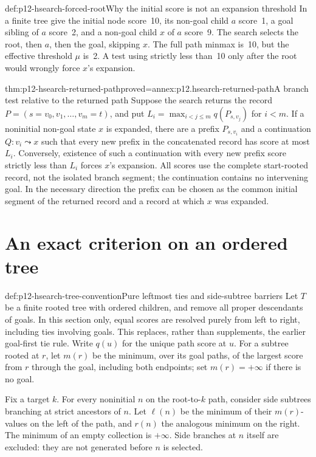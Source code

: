 \begin{hbexample}{def:p12-hsearch-forced-root}{Why the initial score is not an expansion threshold}
In a finite tree give the initial node score~10, its non-goal child
\(a\) score~1, a goal sibling of \(a\) score~2, and a non-goal child
\(x\) of \(a\) score~9. The search selects the root, then \(a\),
then the goal, skipping \(x\). The full path minmax is~10, but the
effective threshold \(\mu\) is~2. A test using strictly less than~10
only after the root would wrongly force \(x\)'s expansion.
\end{hbexample}

\begin{hbtheorem}{thm:p12-hsearch-returned-path}{proved=annex:p12.hsearch-returned-path}{A branch test relative to the returned path}
Suppose the search returns the record
\(P=(s=v_0,v_1,\ldots,v_m=t)\), and put
\(L_i=\max_{i<j\le m}q(P_{s,v_j})\) for \(i<m\).
If a noninitial non-goal state \(x\) is expanded, there are a prefix
\(P_{s,v_i}\) and a continuation \(Q:v_i\leadsto x\) such that
every new prefix in the concatenated record has score at most \(L_i\).
Conversely, existence of such a continuation with every new prefix
score strictly less than \(L_i\) forces \(x\)'s expansion.
All scores use the complete start-rooted record, not the isolated branch
segment; the continuation contains no intervening goal.
In the necessary direction the prefix can be chosen as the common
initial segment of the returned record and a record at which \(x\)
was expanded.
\end{hbtheorem}

\section{An exact criterion on an ordered tree}
\label{sec:p12-hsearch-ordered-tree}

\begin{hbdefinition}{def:p12-hsearch-tree-convention}{Pure leftmost ties and side-subtree barriers}
Let \(T\) be a finite rooted tree with ordered children, and remove
all proper descendants of goals. In this section only, equal scores
are resolved purely from left to right, including ties involving goals.
This replaces, rather than supplements, the earlier goal-first tie rule.
Write \(q(u)\) for the unique path score at \(u\).
For a subtree rooted at \(r\), let \(m(r)\) be the minimum, over
its goal paths, of the largest score from \(r\) through the goal,
including both endpoints; set \(m(r)=+\infty\) if there is no goal.

Fix a target \(k\). For every noninitial \(n\) on the root-to-\(k\)
path, consider side subtrees branching at strict ancestors of \(n\).
Let \(\ell(n)\) be the minimum of their \(m(r)\)-values on the
left of the path, and \(r(n)\) the analogous minimum on the right.
The minimum of an empty collection is \(+\infty\). Side branches
at \(n\) itself are excluded: they are not generated before \(n\)
is selected.
\end{hbdefinition}

